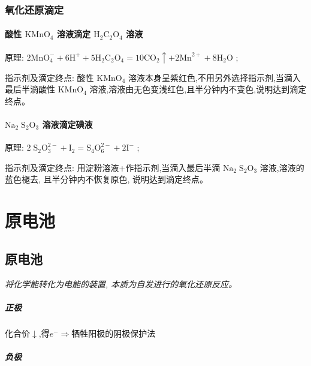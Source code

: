 \documentclass[10pt,cn]{elegantbook}
\begin{document}
\subsection{氧化还原滴定}

\subsubsection{酸性 \({\mathrm{{KMnO}}}_{4}\) 溶液滴定 \({\mathrm{H}}_{2}{\mathrm{C}}_{2}{\mathrm{O}}_{4}\) 溶液}

原理: \(2{\mathrm{{MnO}}}_{4}^{ - } + 6{\mathrm{H}}^{ + } + 5{\mathrm{H}}_{2}{\mathrm{C}}_{2}{\mathrm{O}}_{4} = {10}{\mathrm{{CO}}}_{2} \uparrow + 2{\mathrm{{Mn}}}^{2 + } + 8{\mathrm{H}}_{2}\mathrm{O}\) ;

指示剂及滴定终点: 酸性 \({\mathrm{{KMnO}}}_{4}\) 溶液本身呈紫红色,不用另外选择指示剂,当滴入最后半滴酸性 \({\mathrm{{KMnO}}}_{4}\) 溶液,溶液由无色变浅红色,且半分钟内不变色,说明达到滴定终点。

\subsubsection{ \({\mathrm{{Na}}}_{2}{\mathrm{\;S}}_{2}{\mathrm{O}}_{3}\) 溶液滴定碘液}

原理: \(2{\mathrm{\;S}}_{2}{\mathrm{O}}_{3}^{2 - } + {\mathrm{I}}_{2} = {\mathrm{S}}_{4}{\mathrm{O}}_{6}^{2 - } + 2{\mathrm{I}}^{ - }\) ;

指示剂及滴定终点: 用淀粉溶液+作指示剂,当滴入最后半滴 \({\mathrm{{Na}}}_{2}{\mathrm{\;S}}_{2}{\mathrm{O}}_{3}\) 溶液,溶液的蓝色褪去, 且半分钟内不恢复原色, 说明达到滴定终点。


\chapter{原电池}

\section{原电池}

\textit{将化学能转化为电能的装置, 本质为自发进行的氧化还原反应。}

\paragraph*{正极}

化合价$\downarrow$,得$e^{-}$$\Rightarrow$牺牲阳极的阴极保护法

\paragraph*{负极}
\end{document}
